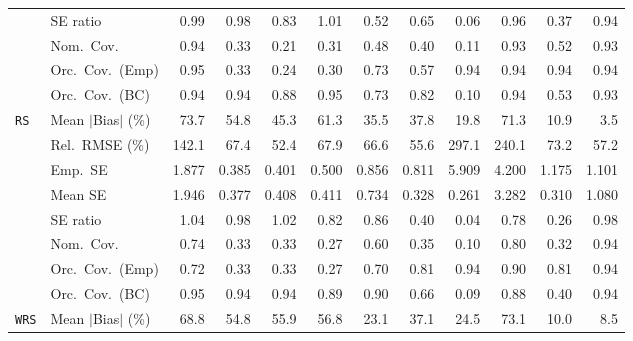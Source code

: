 \begin{landscape}
\begin{longtable}{llrrrrrrrrrr}
 & SE ratio & \cellcolor{rankone}0.99 & \cellcolor{ranktwo}0.98 & 0.83 & \cellcolor{rankone}1.01 & 0.52 & 0.65 & 0.06 & \cellcolor{rankthree}0.96 & 0.37 & 0.94 \\
 & Nom.\ Cov. & \cellcolor{rankone}0.94 & 0.33 & 0.21 & 0.31 & 0.48 & 0.40 & 0.11 & \cellcolor{ranktwo}0.93 & \cellcolor{rankthree}0.52 & \cellcolor{ranktwo}0.93 \\
 & Orc.\ Cov.\ (Emp) & \cellcolor{rankone}0.95 & 0.33 & 0.24 & 0.30 & \cellcolor{rankthree}0.73 & 0.57 & \cellcolor{ranktwo}0.94 & \cellcolor{ranktwo}0.94 & \cellcolor{ranktwo}0.94 & \cellcolor{ranktwo}0.94 \\
 & Orc.\ Cov.\ (BC) & \cellcolor{ranktwo}0.94 & \cellcolor{ranktwo}0.94 & 0.88 & \cellcolor{rankone}0.95 & 0.73 & 0.82 & 0.10 & \cellcolor{ranktwo}0.94 & 0.53 & \cellcolor{rankthree}0.93 \\
\addlinespace[2pt]
\quad \texttt{RS} & Mean $|$Bias$|$ (\%) & 73.7 & 54.8 & 45.3 & 61.3 & 35.5 & 37.8 & \cellcolor{rankthree}19.8 & 71.3 & \cellcolor{ranktwo}10.9 & \cellcolor{rankone}3.5 \\
 & Rel.\ RMSE (\%) & 142.1 & 67.4 & \cellcolor{rankone}52.4 & 67.9 & 66.6 & \cellcolor{ranktwo}55.6 & 297.1 & 240.1 & 73.2 & \cellcolor{rankthree}57.2 \\
 & Emp.\ SE & 1.877 & 0.385 & 0.401 & 0.500 & 0.856 & 0.811 & 5.909 & 4.200 & 1.175 & 1.101 \\
 & Mean SE & 1.946 & 0.377 & 0.408 & 0.411 & 0.734 & 0.328 & 0.261 & 3.282 & 0.310 & 1.080 \\
 & SE ratio & \cellcolor{ranktwo}1.04 & \cellcolor{rankone}0.98 & \cellcolor{rankone}1.02 & 0.82 & \cellcolor{rankthree}0.86 & 0.40 & 0.04 & 0.78 & 0.26 & \cellcolor{rankone}0.98 \\
 & Nom.\ Cov. & \cellcolor{rankthree}0.74 & 0.33 & 0.33 & 0.27 & 0.60 & 0.35 & 0.10 & \cellcolor{ranktwo}0.80 & 0.32 & \cellcolor{rankone}0.94 \\
 & Orc.\ Cov.\ (Emp) & 0.72 & 0.33 & 0.33 & 0.27 & 0.70 & \cellcolor{rankthree}0.81 & \cellcolor{rankone}0.94 & \cellcolor{ranktwo}0.90 & \cellcolor{rankthree}0.81 & \cellcolor{rankone}0.94 \\
 & Orc.\ Cov.\ (BC) & \cellcolor{rankone}0.95 & \cellcolor{ranktwo}0.94 & \cellcolor{ranktwo}0.94 & 0.89 & \cellcolor{rankthree}0.90 & 0.66 & 0.09 & 0.88 & 0.40 & \cellcolor{ranktwo}0.94 \\
\addlinespace[2pt]
\quad \texttt{WRS} & Mean $|$Bias$|$ (\%) & 68.8 & 54.8 & 55.9 & 56.8 & \cellcolor{rankthree}23.1 & 37.1 & 24.5 & 73.1 & \cellcolor{ranktwo}10.0 & \cellcolor{rankone}8.5 \\

\end{longtable}
\end{landscape}
